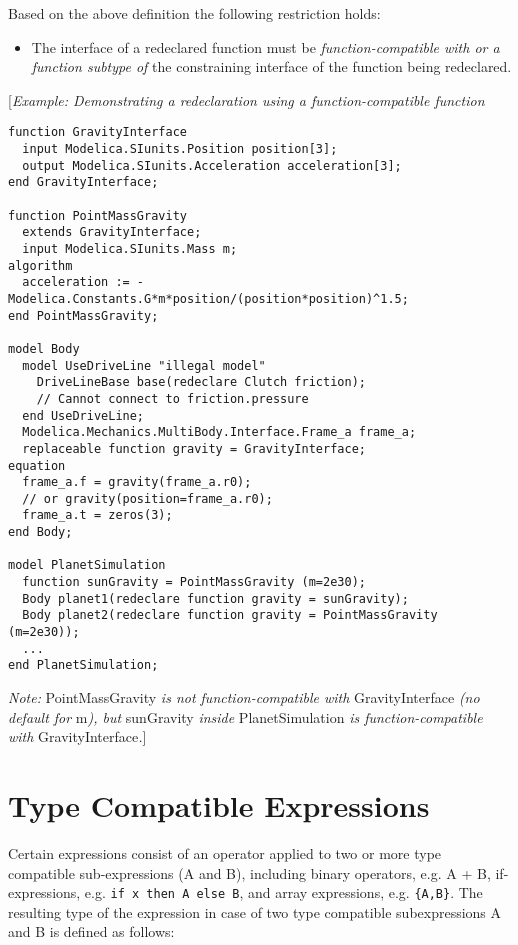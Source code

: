 Based on the above definition the following restriction holds:

\begin{itemize}
\item
  The interface of a redeclared function must be
  \emph{function-compatible with or a function subtype of} the
  constraining interface of the function being redeclared.
\end{itemize}

{[}\emph{Example: Demonstrating a redeclaration using a
function-compatible function}
\begin{lstlisting}[language=modelica]
function GravityInterface
  input Modelica.SIunits.Position position[3];
  output Modelica.SIunits.Acceleration acceleration[3];
end GravityInterface;

function PointMassGravity
  extends GravityInterface;
  input Modelica.SIunits.Mass m;
algorithm
  acceleration := -Modelica.Constants.G*m*position/(position*position)^1.5;
end PointMassGravity;

model Body
  model UseDriveLine "illegal model"
    DriveLineBase base(redeclare Clutch friction);
    // Cannot connect to friction.pressure
  end UseDriveLine;
  Modelica.Mechanics.MultiBody.Interface.Frame_a frame_a;
  replaceable function gravity = GravityInterface;
equation
  frame_a.f = gravity(frame_a.r0);
  // or gravity(position=frame_a.r0);
  frame_a.t = zeros(3);
end Body;

model PlanetSimulation
  function sunGravity = PointMassGravity (m=2e30);
  Body planet1(redeclare function gravity = sunGravity);
  Body planet2(redeclare function gravity = PointMassGravity (m=2e30));
  ...
end PlanetSimulation;
\end{lstlisting}

\emph{Note:} PointMassGravity \emph{is not function-compatible with}
GravityInterface \emph{(no default for} m\emph{), but} sunGravity
\emph{inside} PlanetSimulation \emph{is function-compatible with}
GravityInterface\emph{.}{]}

\section{Type Compatible Expressions}

Certain expressions consist of an operator applied to two or more type
compatible sub-expressions (A and B), including binary operators, e.g. A
+ B, if-expressions, e.g. \lstinline[basicstyle=\ttfamily]!if x then A else B!, and array expressions,
e.g. \lstinline[basicstyle=\ttfamily]!{A,B}!. The resulting type of the expression in case of two type
compatible subexpressions A and B is defined as follows:

